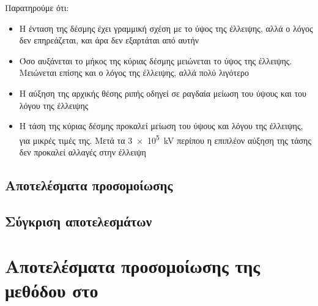 Παρατηρούμε ότι:
\begin{itemize}
\item Η ένταση της δέσμης έχει γραμμική σχέση με το ύψος της έλλειψης, αλλά ο λόγος δεν επηρεάζεται, και άρα δεν εξαρτάται από αυτήν
\item Όσο αυξάνεται το μήκος της κύριας δέσμης μειώνεται το ύψος της έλλειψης. \\
Μειώνεται επίσης και ο λόγος της έλλειψης, αλλά πολύ λιγότερο
\item Η αύξηση της αρχικής θέσης ριπής οδηγεί σε ραγδαία μείωση του ύψους και του λόγου της έλλειψης
\item Η τάση της κύριας δέσμης προκαλεί μείωση του ύψους και λόγου της έλλειψης, για μικρές τιμές της. 
Μετά τα \SI{3e5}{\kilo \volt} περίπου η επιπλέον αύξηση της τάσης δεν προκαλεί αλλαγές στην έλλειψη
\end{itemize}


\subsection{Αποτελέσματα προσομοίωσης}



\subsection{Σύγκριση αποτελεσμάτων}







\section{Αποτελέσματα προσομοίωσης της μεθόδου στο }

